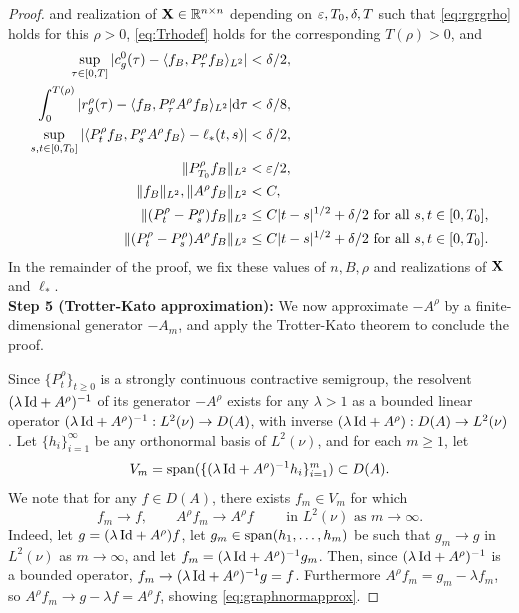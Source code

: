 \begin{proof}
and realization of $\X \in \R^{n \times n}$ depending on $\eps,T_0,\delta,T$   such that \eqref{eq:rgrgrho} holds for
this $\rho>0$,
\eqref{eq:Trhodef} holds for the corresponding $T(\rho)>0$, and  
\begin{align}
\sup_{\tau \in [0,T]} |c_g^0(\tau)
-\langle f_B,P_\tau^\rho f_B \rangle_{L^2}|&<\delta/2,\label{eq:cgsemigroupapprox}\\
\int_0^{T(\rho)} |r_g^\rho(\tau)-\langle f_B,P_\tau^\rho A^\rho f_B
\rangle_{L^2}|\d\tau&<\delta/8,\label{eq:rgsemigroupapprox}\\
\sup_{s,t \in [0,T_0]} |\langle P_t^\rho f_B,P_s^\rho A^\rho f_B
\rangle-\ell_*(t,s)|&<\delta/2,\label{eq:lstarapprox}\\
\|P_{T_0}^\rho f_B\|_{L^2}&<\eps/2,\label{eq:contractionatT0}\\
\|f_B\|_{L^2},\|A^\rho f_B\|_{L^2}&<C,\label{eq:AfBbound}\\
\|(P_t^\rho-P_s^\rho)f_B\|_{L^2} &\leq C|t-s|^{1/2}+\delta/2
\text{ for all } s,t \in [0,T_0],\label{eq:PtPsbound}\\
\|(P_t^\rho-P_s^\rho)A^\rho f_B\|_{L^2} &\leq C|t-s|^{1/2}+\delta/2
\text{ for all } s,t \in [0,T_0].\label{eq:PtPsAbound}
\end{align}
In the remainder of the proof, we fix these values of $n,B,\rho$
and realizations of $\X$ and $\ell_*$.\\

{\bf Step 5 (Trotter-Kato approximation):}
We now approximate ${-}A^\rho$ by a finite-dimensional generator ${-}A_m$, and
apply the Trotter-Kato theorem to conclude the proof.

Since $\{P_t^\rho\}_{t \geq 0}$ is a strongly continuous contractive semigroup, 
the resolvent $(\lambda\,\Id+A^\rho)^{-1}$ of its generator
${-}A^\rho$ exists for any
$\lambda>1$ as a bounded linear operator $(\lambda\,\Id+A^\rho)^{-1}:L^2(\nu) \to
D(A)$, with inverse $(\lambda\,\Id+A^\rho):D(A) \to L^2(\nu)$ \cite[Theorem
1.10]{engel2000one}. Let $\{h_i\}_{i=1}^\infty$ be any orthonormal basis of
$L^2(\nu)$, and for each $m \geq 1$, let
\[V_m=\sp(\{(\lambda\,\Id+A^\rho)^{-1}h_i\}_{i=1}^m) \subset D(A).\]
We note that for any $f \in D(A)$,
there exists $f_m \in V_m$ for which
\begin{equation}\label{eq:graphnormapprox}
f_m \to f, \qquad A^\rho f_m \to A^\rho f \qquad \text{ in } L^2(\nu)
\text{ as } m \to \infty.
\end{equation}
Indeed, let
$g=(\lambda\,\Id+A^\rho)f$, let $g_m \in \sp(h_1,\ldots,h_m)$ be such that
$g_m \to g$ in $L^2(\nu)$ as $m \to \infty$,
and let $f_m=(\lambda\,\Id+A^\rho)^{-1}g_m$. Then, since
$(\lambda\,\Id+A^\rho)^{-1}$ is a bounded operator, $f_m \to
(\lambda\,\Id+A^\rho)^{-1}g=f$. Furthermore $A^\rho
f_m=g_m-\lambda f_m$, so $A^\rho f_m \to g-\lambda f=A^\rho f$, showing
\eqref{eq:graphnormapprox}.


\end{proof}
